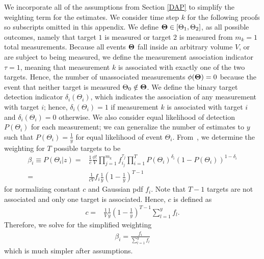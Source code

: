 \documentclass[letterpaper, 10pt, conference]{ieeeconf}
\begin{document}
\begin{appendix}
\label{append}

We incorporate all of the assumptions from Section \ref{DAP} to simplify the weighting term for the estimates.
We consider time step $k$ for the following proofs so subscripts omitted in this appendix.
We define ${\bf{\Theta}}\in[\Theta_1, \Theta_2]$, as all possible outcomes, namely that target $1$ is measured or target $2$ is measured from $m_k=1$ total measurements. Because all events ${\bf{\Theta}}$ fall inside an arbitrary volume $V$, or are subject to being measured, we define the measurement association indicator $\tau=1$, meaning that measurement $k$ is associated with exactly one of the two targets. Hence, the number of unassociated measurements $\phi({\bf{\Theta}})=0$ because the event that neither target is measured $\Theta_0\notin{\bf{\Theta}}$. We define the binary target detection indicator $\delta_i(\Theta_i)$, which indicates the association of any measurement with target $i$; hence, $\delta_i(\Theta_i)=1$ if measurement $k$ is associated with target $i$ and $\delta_i(\Theta_i)=0$ otherwise.
We also consider equal likelihood of detection $P(\Theta_i)$ for each measurement; we can generalize the number of estimates to $y$ such that $P(\Theta_i)=\frac{1}{y}$ for equal likelihood of event $\Theta_i$.
From~\cite[Section 9.3]{TrackDataAssoc}, we determine the weighting for $T$ possible targets to be
\begin{align}
\beta_i\equiv P(\Theta_i|z)=&\frac{1}{c}\frac{\phi!}{V}\displaystyle\prod_{j=1}^{m_k} f_{i_j}^{\tau_j}\displaystyle\prod_{i=1}^{T} P(\Theta_i)^{\delta_i}(1-P(\Theta_i))^{1-\delta_i}\\
=&\frac{1}{cV}f_{i}\frac{1}{y}(1-\frac1y)^{T-1}
\end{align}
for normalizing constant $c$ and Gaussian pdf $f_{i}$. Note that $T-1$ targets are not associated and only one target is associated. Hence, $c$ is defined as
\begin{align}
c=&\frac{1}{V}\frac{1}{y}(1-\frac1y)^{T-1}\displaystyle\sum\limits_{l=1}^y f_{l}.
\end{align}
Therefore, we solve for the simplified weighting
\begin{align}
\beta_i=\frac{f_i}{\displaystyle\sum\limits_{l=1}^y f_{l}}
\end{align}
which is much simpler after assumptions.


\end{appendix}
\end{document}
